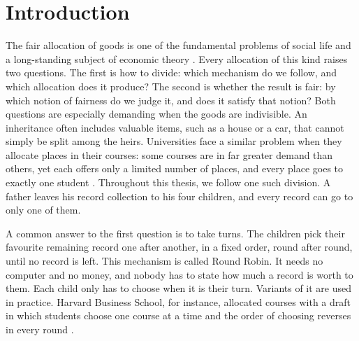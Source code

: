 \chapter{Introduction}\label{ch:intro}

The fair allocation of goods is one of the fundamental problems of social life and a long-standing
subject of economic theory \parencite{amanatidis2023survey}. Every allocation of this kind raises
two questions. The first is how to divide: which mechanism do we follow, and which allocation does
it produce? The second is whether the result is fair: by which notion of fairness do we judge it, and
does it satisfy that notion? Both questions are especially demanding when the goods are indivisible. An
inheritance often includes valuable items, such as a house or a car, that cannot simply be split among
the heirs. Universities face a similar problem when they allocate places in their courses: some
courses are in far greater demand than others, yet each offers only a limited number of places, and
every place goes to exactly one student \parencite[p.~1062]{budish2011}. Throughout this thesis, we follow one such division. A father leaves his record collection to his
four children, and every record can go to only one of them.

A common answer to the first question is to take turns. The children pick their favourite
remaining record one after another, in a fixed order, round after round, until no record is left.
This mechanism is called Round Robin. It needs no computer and no money, and nobody has to state how
much a record is worth to them. Each child only has to choose when it is their turn. Variants of it
are used in practice. Harvard Business School, for instance, allocated courses with a draft in
which students choose one course at a time and the order of choosing reverses in every round
\parencite[p.~1065]{budish2011}.

